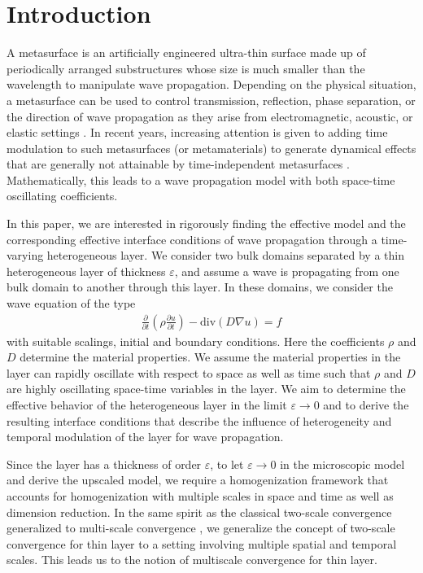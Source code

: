 \documentclass[11pt]{article}
\def\es{\varepsilon}
\def\p{\partial}
\begin{document}
\section{Introduction}\label{section:Introduction}
A metasurface is an artificially engineered ultra-thin surface made up of periodically arranged substructures whose size is much smaller than the wavelength to manipulate wave propagation. 
Depending on the physical situation, a metasurface  can be used to control transmission, reflection, phase separation, or the direction of wave propagation as they arise from electromagnetic, acoustic, or elastic settings \cite{Davies2025Roadmap}. In recent years, increasing attention is given to adding time modulation to such metasurfaces (or metamaterials) to generate dynamical effects that are generally not attainable by time-independent metasurfaces \cite{HuidobroSilveirinhaGaliffiPendry2021,Shaltout2019Spatiotemporal,DarcheAssierGuenneauLombardTouboul2025,Garg2024TwoStep,AmmariCaoHiltunenRueff2026}. Mathematically, this leads to a wave propagation model with both space-time oscillating coefficients.

In this paper, we are interested in rigorously finding the effective model and the corresponding effective interface conditions of wave propagation through a time-varying heterogeneous layer. We consider two bulk domains separated by a thin heterogeneous layer of thickness $\es$, and assume a wave is propagating from one bulk domain to another through this layer.  In these domains, we consider the wave equation of the type
\begin{align*}
    \frac{\p }{\p t}\left(\rho \frac{\p u}{\p t}\right)-\mathrm{div} \left(D\nabla u\right)=f
\end{align*}
with suitable scalings, initial and boundary conditions. Here the coefficients $\rho$ and $D$ determine the material properties. 
We assume the material properties in the layer can rapidly oscillate with respect to space as well as time such that $\rho$ and $D$ are highly oscillating space-time variables in the layer. We aim to determine the effective behavior of the heterogeneous layer in the limit $\es\rightarrow 0$ and to derive the resulting interface conditions that describe the influence of heterogeneity and temporal modulation of the layer for wave propagation.

Since the layer has a thickness of order $\es$, to let $\es\rightarrow 0$ in the microscopic model and derive the upscaled model, we require a homogenization framework that accounts for homogenization with multiple scales in space and time as well as dimension reduction. In the same spirit as the classical two-scale convergence \cite{Allaire1992} generalized to multi-scale convergence \cite{allaire1996multiscale}, we generalize the concept of two-scale convergence for thin layer \cite{neuss2007effective} to a setting involving multiple spatial and temporal scales. This leads us to the notion of multiscale convergence for thin layer.
\end{document}
